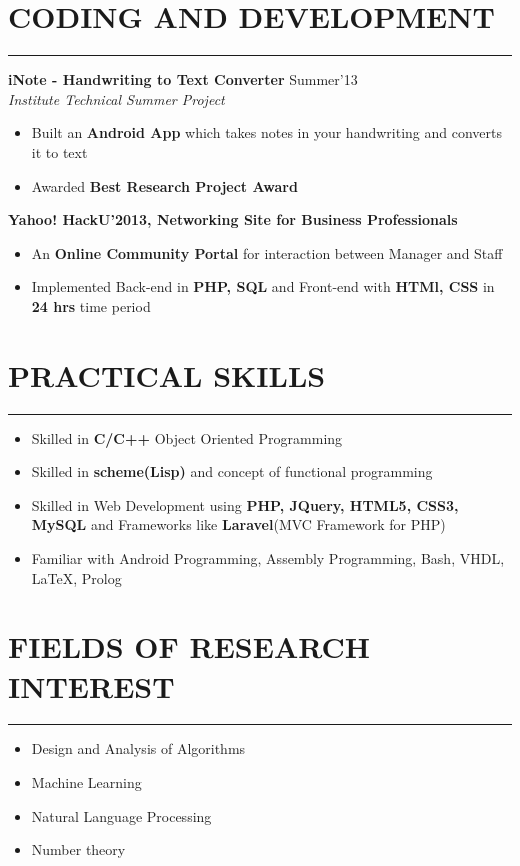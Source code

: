 \message{ !name(resume2.tex)}\documentclass[11pt]{book} %
\begin{document}
\section*{CODING AND DEVELOPMENT}
\hrule
\medskip
\vspace{2mm}
\noindent \textbf{iNote - Handwriting to Text Converter} \hfill Summer'13\\
\textit{Institute Technical Summer Project}
\vspace{-2mm}
\begin{itemize}
\itemsep-0.1em
\item Built an \textbf{Android App} which takes notes in your handwriting and converts it to text
\item Awarded \textbf{Best Research Project Award}
\end{itemize}

\noindent \textbf{Yahoo! HackU’2013, Networking Site for Business Professionals}
\begin{itemize}
\itemsep-0.1em
\item An \textbf{Online Community Portal} for interaction between Manager and Staff
\item Implemented Back-end in \textbf{PHP, SQL} and Front-end with \textbf{HTMl, CSS} in \textbf{24 hrs} time period
\end{itemize}
\vspace{-5mm}


\section*{PRACTICAL SKILLS}
\hrule
\medskip
\vspace{2mm}
\begin{itemize}
\itemsep 0.1em
\item Skilled in \textbf{C/C++} Object Oriented Programming
\item Skilled in \textbf{scheme(Lisp)} and concept of functional programming
\item Skilled in Web Development using \textbf{PHP, JQuery, HTML5, CSS3, MySQL} and Frameworks like \textbf{Laravel}(MVC Framework for PHP)
\item Familiar with Android Programming, Assembly Programming, Bash, VHDL, \LaTeX, Prolog
\end{itemize}
\vspace{-3mm}


\section*{FIELDS OF RESEARCH INTEREST}
\hrule
\medskip
\vspace{2mm}
\begin{itemize}
\itemsep-0.1em
\item Design and Analysis of Algorithms
\item Machine Learning
\item Natural Language Processing
\item Number theory
\end{itemize}
\vspace{-3mm}
\end{document}
